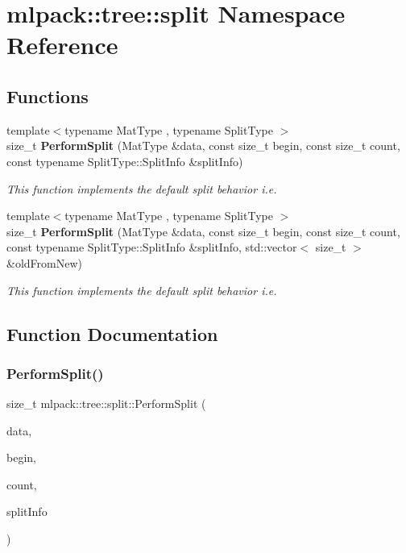 \section{mlpack\+:\+:tree\+:\+:split Namespace Reference}
\label{namespacemlpack_1_1tree_1_1split}
\subsection*{Functions}
\begin{DoxyCompactItemize}
\item 
{\footnotesize template$<$typename Mat\+Type , typename Split\+Type $>$ }\\size\+\_\+t \textbf{ Perform\+Split} (Mat\+Type \&data, const size\+\_\+t begin, const size\+\_\+t count, const typename Split\+Type\+::\+Split\+Info \&split\+Info)
\begin{DoxyCompactList}\small\item\em This function implements the default split behavior i.\+e. \end{DoxyCompactList}\item 
{\footnotesize template$<$typename Mat\+Type , typename Split\+Type $>$ }\\size\+\_\+t \textbf{ Perform\+Split} (Mat\+Type \&data, const size\+\_\+t begin, const size\+\_\+t count, const typename Split\+Type\+::\+Split\+Info \&split\+Info, std\+::vector$<$ size\+\_\+t $>$ \&old\+From\+New)
\begin{DoxyCompactList}\small\item\em This function implements the default split behavior i.\+e. \end{DoxyCompactList}\end{DoxyCompactItemize}


\subsection{Function Documentation}
\mbox{\label{namespacemlpack_1_1tree_1_1split_ae701f1590f5c0fb8ddea4af189f3ee8a}} 
\subsubsection{Perform\+Split()\hspace{0.1cm}{\footnotesize\ttfamily [1/2]}}
{\footnotesize\ttfamily size\+\_\+t mlpack\+::tree\+::split\+::\+Perform\+Split (\begin{DoxyParamCaption}\item[{Mat\+Type \&}]{data,  }\item[{const size\+\_\+t}]{begin,  }\item[{const size\+\_\+t}]{count,  }\item[{const typename Split\+Type\+::\+Split\+Info \&}]{split\+Info }\end{DoxyParamCaption})}



